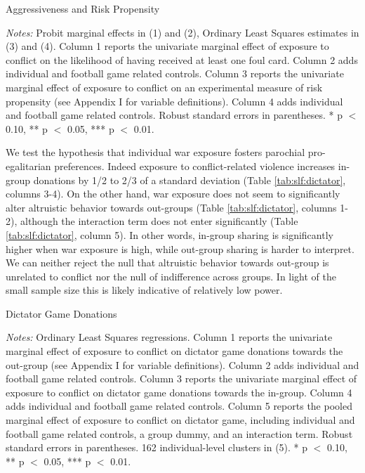 \begin{threeparttable}[htb]
	\caption{Aggressiveness and Risk Propensity}
	\label{tab:slf:aggrisk}
	\centering
	
	\begin{tablenotes}
		\item \textit{Notes:} Probit marginal effects in (1) and (2), Ordinary Least Squares estimates in (3) and (4). Column 1 reports the univariate marginal effect of exposure to conflict on the likelihood of having received at least one foul card. Column 2 adds individual and football game related controls. Column 3 reports the univariate marginal effect of exposure to conflict on an experimental measure of risk propensity (see Appendix I for variable definitions). Column 4 adds individual and football game related controls. Robust standard errors in parentheses. * p $<$ 0.10, ** p $<$ 0.05, *** p $<$ 0.01.
		\item
	\end{tablenotes}
\end{threeparttable}

We test the hypothesis that individual war exposure fosters parochial pro-egalitarian preferences. Indeed exposure to conflict-related violence increases in-group donations by 1/2 to 2/3 of a standard deviation (Table \ref{tab:slf:dictator}, columns 3-4). On the other hand, war exposure does not seem to significantly alter altruistic behavior towards out-groups (Table \ref{tab:slf:dictator}, columns 1-2), although the interaction term does not enter significantly (Table \ref{tab:slf:dictator}, column 5). In other words, in-group sharing is significantly higher when war exposure is high, while out-group sharing is harder to interpret. We can neither reject the null that altruistic behavior towards out-group is unrelated to conflict nor the null of indifference across groups. In light of the small sample size this is likely indicative of relatively low power.

\begin{threeparttable}[htb]
	\caption{Dictator Game Donations}
	\label{tab:slf:dictator}
	\centering
	
	\begin{tablenotes}
		\item \textit{Notes:} Ordinary Least Squares regressions. Column 1 reports the univariate marginal effect of exposure to conflict on dictator game donations towards the out-group (see Appendix I for variable definitions). Column 2 adds individual and football game related controls. Column 3 reports the univariate marginal effect of exposure to conflict on dictator game donations towards the in-group. Column 4 adds individual and football game related controls. Column 5 reports the pooled marginal effect of exposure to conflict on dictator game, including individual and football game related controls, a group dummy, and an interaction term. Robust standard errors in parentheses. 162 individual-level clusters in (5). * p $<$ 0.10, ** p $<$ 0.05, *** p $<$ 0.01.
		\item
	\end{tablenotes}
\end{threeparttable}

